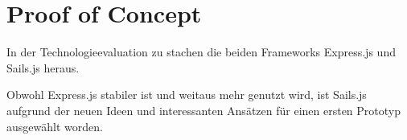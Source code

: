 \section{Proof of Concept}
\label{sec:proof-of-concept}

In der Technologieevaluation zu  stachen die beiden Frameworks Express.js \cite{Expressjs}
und Sails.js \cite{sails} heraus.

Obwohl Express.js stabiler ist und weitaus mehr genutzt wird, ist Sails.js aufgrund der neuen Ideen und interessanten Ansätzen für einen ersten Prototyp ausgewählt worden.



